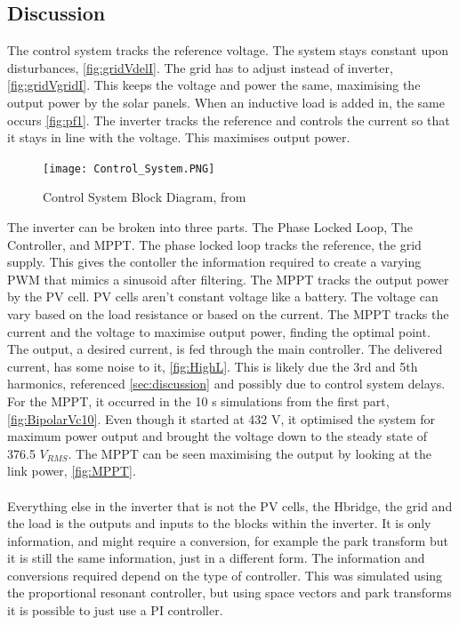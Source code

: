 \documentclass[12pt,twoside]{scrartcl}
\begin{document}
\subsection{Discussion}
The control system tracks the reference voltage. The system stays constant upon disturbances, \ref{fig:gridVdelI}.
The grid has to adjust instead of inverter, \ref{fig:gridVgridI}. This keeps the voltage and power the same, maximising the output power
by the solar panels. When an inductive load is added in, the same occurs \ref{fig:pf1}. The inverter tracks the reference and controls the current
so that it stays in line with the voltage. This maximises output power. \\
\begin{figure}[htp]
    \centering
    \texttt{[image: Control\_System.PNG]}
    \caption{Control System Block Diagram, from \cite{Control}}
    \label{fig:Control}
\end{figure}
\newline
The inverter can be broken into three parts. The Phase Locked Loop, The Controller, and MPPT. The phase locked loop tracks the reference, the grid supply.
This gives the contoller the information required to create a varying PWM that mimics a sinusoid after filtering. The MPPT tracks the output power by the PV cell.
PV cells aren't constant voltage like a battery. The voltage can vary based on the load resistance or based on the current. The MPPT tracks the current
and the voltage to maximise output power, finding the optimal point. The output, a desired current, is fed through 
the main controller. The delivered current, has some noise to it, \ref{fig:HighL}. 
This is likely due the 3rd and 5th harmonics, referenced \ref{sec:discussion} and possibly due to control system delays. 
\newpage
\noindent
For the MPPT, it occurred in the 10 s simulations from the first part, \ref{fig:BipolarVc10}. Even though it started at 432 V, it optimised the system for maximum
power output and brought the voltage down to the steady state of 376.5 $V_{RMS}$. 
The MPPT can be seen maximising the output by looking at the link power, \ref{fig:MPPT}. 
\\
\\
\noindent
Everything else in the inverter that is not the PV cells, the Hbridge, the grid and the load is the outputs and inputs to the blocks within the inverter. It is only information, and might require a conversion, for example the park transform but it is still the same information, just in a different form. The information and conversions required depend on the type of controller. This was simulated using the proportional resonant controller, but using space vectors and park transforms it is possible to just use a PI controller. 
 


\newpage


\end{document}
